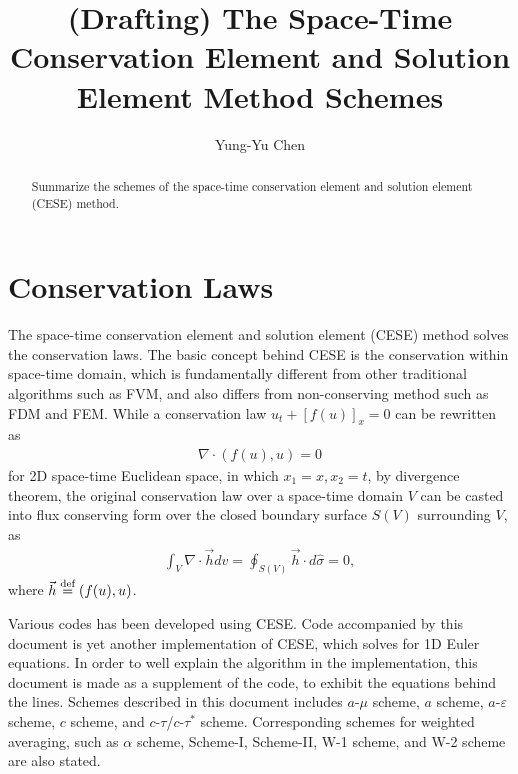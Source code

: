 \documentclass[11pt,dvips]{article}
\title{
%
(Drafting) The Space-Time Conservation Element and Solution Element Method
Schemes
%
}
\author{
%
Yung-Yu Chen
%
}
\numberwithin{equation}{section}
\newcommand{\defeq}{\ensuremath{\buildrel {\text{def}}\over{=}}}
\begin{document}
\maketitle

\begin{abstract}
%
Summarize the schemes of the space-time conservation element and solution
element (CESE) method.
%
\end{abstract}

\section{Conservation Laws}
%
\label{s:conlaw}

The space-time conservation element and solution element (CESE) method solves
the conservation laws\cite{lax_hyperbolic_1973}.  The basic concept behind CESE
is the conservation within space-time domain, which is fundamentally different
from other traditional algorithms such as FVM, and also differs from
non-conserving method such as FDM and FEM\cite{chang_method_1995}.  While a
conservation law $u_t+[f(u)]_x=0$ can be rewritten as
\begin{align*}
  \nabla\cdot(f(u),u) = 0
\end{align*}
for 2D space-time Euclidean space, in which $x_1=x,x_2=t$, by divergence
theorem, the original conservation law over a space-time domain $V$ can be
casted into flux conserving form over the closed boundary surface $S(V)$
surrounding $V$, as
\begin{align*}
  \int_V\nabla\cdot\vec{h}dv = \oint_{S(V)}\vec{h}\cdot d\hat{\sigma} = 0,
\end{align*}
where $\vec{h}\defeq(f(u),u)$.

Various codes has been developed using CESE\cite{chang_method_1995}.  Code
accompanied by this document is yet another implementation of CESE, which
solves for 1D Euler equations.  In order to well explain the algorithm in the
implementation, this document is made as a supplement of the code, to exhibit
the equations behind the lines.  Schemes described in this document includes
$a$-$\mu$ scheme, $a$ scheme, $a$-$\varepsilon$ scheme\cite{chang_method_1995},
$c$ scheme, and $c$-$\tau$/$c$-$\tau^*$
scheme\cite{chang_multi-dimensional_2003}.  Corresponding schemes for weighted
averaging, such as $\alpha$ scheme\cite{chang_method_1995}, Scheme-I,
Scheme-II\cite{chang_courant_2002}, W-1 scheme, and W-2
scheme\cite{chang_multi-dimensional_2003} are also stated.
\end{document}

